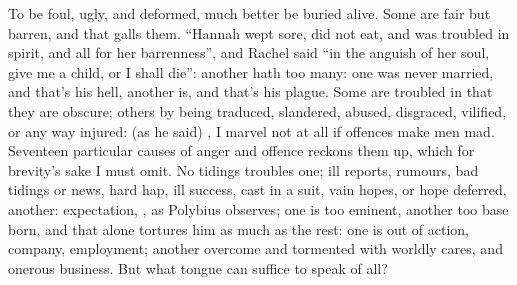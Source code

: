 
To be foul, ugly, and deformed, much better be buried alive. Some are fair but
barren, and that galls them. \enquote{Hannah wept sore, did not eat, and was troubled
in spirit, and all for her barrenness},  and  Rachel said \enquote{in the anguish of her soul, give me a child, or I shall die}:
another hath too many: one was never married, and that's his hell, another is,
and that's his plague. Some are troubled in that they are obscure; others by
being traduced, slandered, abused, disgraced, vilified, or any way injured:
 (as he said) , I
marvel not at all if offences make men mad. Seventeen particular causes of
anger and offence \Aristotle{} reckons them up, which for brevity's sake I must
omit. No tidings troubles one; ill reports, rumours, bad tidings or news, hard
hap, ill success, cast in a suit, vain hopes, or hope deferred, another:
expectation, , as
Polybius observes; one is too eminent, another too base
born, and that alone tortures him as much as the rest: one is out of action,
company, employment; another overcome and tormented with worldly cares, and
onerous business. But what tongue can suffice to speak of
all?

